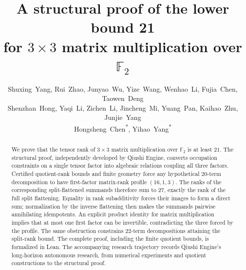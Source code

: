 \documentclass[11pt,reqno]{amsart}
\title[A structural lower bound for binary matrix multiplication]
{A structural proof of the lower bound 21\\
for $3\times3$ matrix multiplication over $\mathbb F_2$}
\author[Shuxing Yang et al.]{\mbox{Shuxing Yang}, \mbox{Rui Zhao},
\mbox{Junyao Wu}, \mbox{Yize Wang}, \mbox{Wenhao Li}, \mbox{Fujia Chen},
\mbox{Taowen Deng}\\
\mbox{Shenzhan Hong}, \mbox{Yaqi Li}, \mbox{Zichen Li},
\mbox{Jincheng Mi}, \mbox{Yuang Pan}, \mbox{Kaihao Zhu}, \mbox{Junjie Yang}\\
\mbox{Hongsheng Chen\textsuperscript{*}},
\mbox{Yihao Yang\textsuperscript{*}}}
\date{}
\numberwithin{equation}{section}
\theoremstyle{definition}
\theoremstyle{remark}
\begin{document}
\begin{abstract}
We prove that the tensor rank of $3\times3$ matrix multiplication over
$\mathbb F_2$ is at least $21$. The structural proof, independently
developed by Qiushi Engine, converts occupation constraints on a single
tensor factor into algebraic relations coupling all three factors.
Certified quotient-rank bounds and finite geometry force any
hypothetical $20$-term decomposition to have first-factor matrix-rank
profile $(16,1,3)$. The ranks of the corresponding split-flattened
summands therefore sum to $27$, exactly the rank of the full split
flattening. Equality in rank subadditivity forces their images to form
a direct sum; normalization by the inverse flattening then makes the
summands pairwise annihilating idempotents. An explicit product identity
for matrix multiplication implies that at most one first factor can be
invertible, contradicting the three forced by the profile. The same
obstruction constrains $22$-term decompositions attaining the
split-rank bound. The complete proof, including the finite quotient
bounds, is formalized in Lean. The accompanying research trajectory
records Qiushi Engine's long-horizon autonomous research, from numerical
experiments and quotient constructions to the structural proof.
\end{abstract}
\maketitle
\raggedbottom








\appendix






\end{document}
